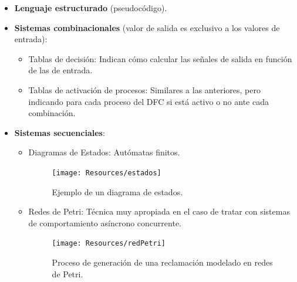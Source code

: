 \begin{itemize}
    \item \textbf{Lenguaje estructurado} (pseudocódigo).
    \item \textbf{Sistemas combinacionales} (valor de salida es exclusivo a los valores de entrada):
    \begin{itemize}
        \item Tablas de decisión: Indican cómo calcular las señales de salida en función de las de entrada.
        \begin{table}[h!]
            \centering
            \caption{Ejemplo de tabla de decisiones de un proceso.}
        \end{table}
        \item Tablas de activación de procesos: Similares a las anteriores, pero indicando para cada proceso del DFC si está activo o no ante cada combinación.
    \end{itemize}
    \item \textbf{Sistemas secuenciales}:
    \begin{itemize}
        \item Diagramas de Estados: Autómatas finitos.
        \begin{figure}[h!]
            \centering
            \texttt{[image: Resources/estados]}
            \caption{Ejemplo de un diagrama de estados.}
        \end{figure}
        \item Redes de Petri: Técnica muy apropiada en el caso de tratar con sistemas de comportamiento asíncrono concurrente.
        \begin{figure}[H]
            \centering
            \texttt{[image: Resources/redPetri]}
            \caption{Proceso de generación de una reclamación modelado en redes de Petri.}
        \end{figure}
    \end{itemize}
\end{itemize}

